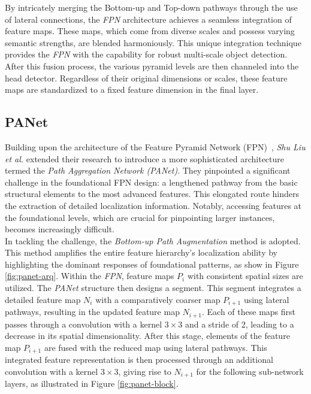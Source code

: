 By intricately merging the Bottom-up and Top-down pathways through the use of lateral connections, the \textit{FPN} architecture achieves a seamless integration of feature maps. These maps, which come from diverse scales and possess varying semantic strengths, are blended harmoniously. This unique integration technique provides the \textit{FPN} with the capability for robust multi-scale object detection. After this fusion process, the various pyramid levels are then channeled into the head detector. Regardless of their original dimensions or scales, these feature maps are standardized to a fixed feature dimension in the final layer.

\subsection{PANet}
Building upon the architecture of the Feature Pyramid Network (FPN)~\cite{Lin_2017_CVPR}, \textit{Shu Liu et al.} extended their research \cite{DBLP:journals/corr/abs-1803-01534} to introduce a more sophisticated architecture termed the \textit{Path Aggregation Network (PANet)}. They pinpointed a significant challenge in the foundational FPN design: a lengthened pathway from the basic structural elements to the most advanced features. This elongated route hinders the extraction of detailed localization information. Notably, accessing features at the foundational levels, which are crucial for pinpointing larger instances, becomes increasingly difficult.\\

In tackling the challenge, the \textit{Bottom-up Path Augmentation} method is adopted. This method amplifies the entire feature hierarchy's localization ability by highlighting the dominant responses of foundational patterns, as show in Figure \ref{fig:panet-arq}. 
Within the \textit{FPN}, feature maps \(P_{i}\) with consistent spatial sizes are utilized. The \textit{PANet} structure then designs a segment. This segment integrates a detailed feature map \(N_{i}\) with a comparatively coarser map \(P_{i+1}\) using lateral pathways, resulting in the updated feature map \(N_{i+1}\). Each of these maps first passes through a convolution with a kernel $3\times 3$ and a stride of 2, leading to a decrease in its spatial dimensionality. After this stage, elements of the feature map \(P_{i+1}\) are fused with the reduced map using lateral pathways. This integrated feature representation is then processed through an additional convolution with a kernel $3\times 3$, giving rise to \(N_{i+1}\) for the following sub-network layers, as illustrated in Figure \ref{fig:panet-block}.

